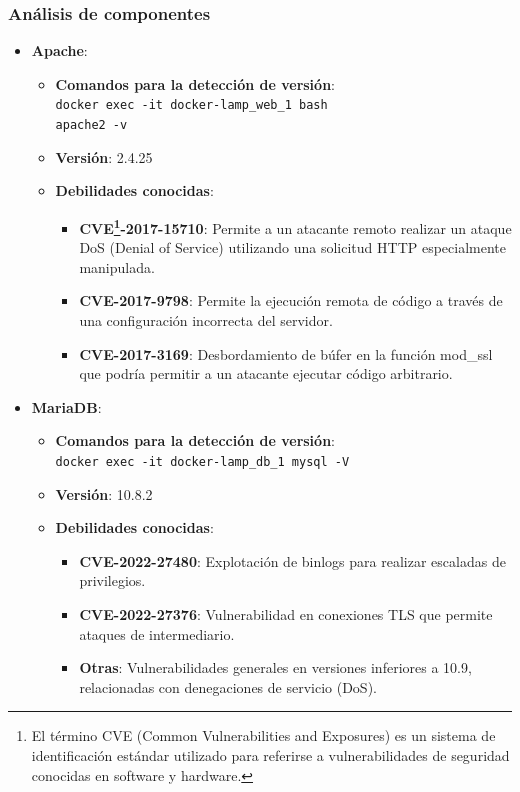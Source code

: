 \documentclass[a4paper,12pt]{article}
\newcommand{\code}[1]{\texttt{#1}}  %
\begin{document}
\subsubsection{Análisis de componentes}
\vspace{1em}
\begin{itemize}
	\item \textbf{Apache}:\begin{itemize} 
		\item \textbf{Comandos para la detección de versión}:\\ \code{docker exec -it docker-lamp\_web\_1 bash} \\
		\code{apache2 -v}
		\item \textbf{Versión}: 2.4.25
		\item \textbf{Debilidades conocidas}: \begin{itemize}
			\item \textbf{CVE\footnote{El término CVE (Common Vulnerabilities and Exposures) es un sistema de identificación estándar utilizado para referirse a vulnerabilidades de seguridad conocidas en software y hardware.}-2017-15710}: Permite a un atacante remoto realizar un ataque DoS (Denial of Service) utilizando una solicitud HTTP especialmente manipulada.
			\item \textbf{CVE-2017-9798}: Permite la ejecución remota de código a través de una configuración incorrecta del servidor.
			\item \textbf{CVE-2017-3169}: Desbordamiento de búfer en la función mod\_ssl que podría permitir a un atacante ejecutar código arbitrario.
		\end{itemize}
	\end{itemize}
	
	\item \textbf{MariaDB}: \begin{itemize}
		\item \textbf{Comandos para la detección de versión}:\\ \code{docker exec -it docker-lamp\_db\_1 mysql -V} 
		\item \textbf{Versión}: 10.8.2
		\item \textbf{Debilidades conocidas}: \begin{itemize}
			\item \textbf{CVE-2022-27480}: Explotación de binlogs para realizar escaladas de privilegios.
			\item \textbf{CVE-2022-27376}: Vulnerabilidad en conexiones TLS que permite ataques de intermediario.
			\item \textbf{Otras}: Vulnerabilidades generales en versiones inferiores a 10.9, relacionadas con denegaciones de servicio (DoS).
		\end{itemize}
	\end{itemize}
	

\end{itemize}
\end{document}
